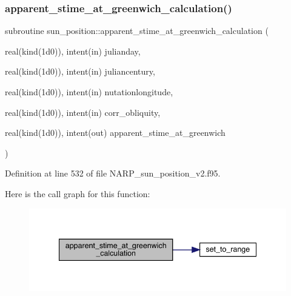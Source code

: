 \subsubsection{\texorpdfstring{apparent\+\_\+stime\+\_\+at\+\_\+greenwich\+\_\+calculation()}{apparent\_stime\_at\_greenwich\_calculation()}}
{\footnotesize\ttfamily subroutine sun\+\_\+position\+::apparent\+\_\+stime\+\_\+at\+\_\+greenwich\+\_\+calculation (\begin{DoxyParamCaption}\item[{real(kind(1d0)), intent(in)}]{julianday,  }\item[{real(kind(1d0)), intent(in)}]{juliancentury,  }\item[{real(kind(1d0)), intent(in)}]{nutationlongitude,  }\item[{real(kind(1d0)), intent(in)}]{corr\+\_\+obliquity,  }\item[{real(kind(1d0)), intent(out)}]{apparent\+\_\+stime\+\_\+at\+\_\+greenwich }\end{DoxyParamCaption})}



Definition at line 532 of file N\+A\+R\+P\+\_\+sun\+\_\+position\+\_\+v2.\+f95.

Here is the call graph for this function\+:\nopagebreak
\begin{figure}[H]
\begin{center}
\leavevmode
\includegraphics[width=340pt]{_n_a_r_p__sun__position__v2_8f95_a0ed15a11ed5c5996a2c4fbe71b31d52d_cgraph}
\end{center}
\end{figure}
\mbox{\label{_n_a_r_p__sun__position__v2_8f95_acff843ecba5d172c4f05df7eede5ac9e}} 
